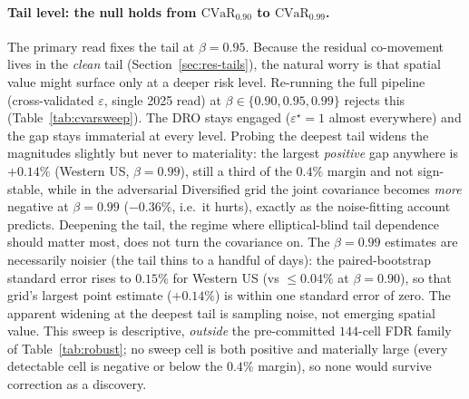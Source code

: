 \documentclass[10pt,twocolumn]{article}
\newcommand{\CVaR}{\mathrm{CVaR}}
\begin{document}
\paragraph{Tail level: the null holds from $\CVaR_{0.90}$ to $\CVaR_{0.99}$.}
The primary read fixes the tail at $\beta=0.95$. Because the residual co-movement
lives in the \emph{clean} tail (Section~\ref{sec:res-tails}), the natural worry is
that spatial value might surface only at a deeper risk level. Re-running the full
pipeline (cross-validated $\varepsilon$, single 2025 read) at
$\beta\in\{0.90,0.95,0.99\}$ rejects this (Table~\ref{tab:cvarsweep}). The DRO stays
engaged ($\varepsilon^\star=1$ almost everywhere) and the gap stays immaterial at
every level. Probing the deepest tail widens the magnitudes slightly but never to
materiality: the largest \emph{positive} gap anywhere is $+0.14\%$ (Western US,
$\beta=0.99$), still a third of the $0.4\%$ margin and not sign-stable, while in the
adversarial Diversified grid the joint covariance becomes \emph{more} negative at
$\beta=0.99$ ($-0.36\%$, i.e.\ it hurts), exactly as the noise-fitting account
predicts. Deepening the tail, the regime where elliptical-blind tail dependence
should matter most, does not turn the covariance on.
The $\beta=0.99$ estimates are necessarily noisier (the tail thins to a handful of
days): the paired-bootstrap standard error rises to $0.15\%$ for Western US (vs
$\le0.04\%$ at $\beta=0.90$), so that grid's largest point estimate ($+0.14\%$) is
within one standard error of zero. The apparent widening at the deepest tail is
sampling noise, not emerging spatial value. This sweep is descriptive, \emph{outside}
the pre-committed $144$-cell FDR family of Table~\ref{tab:robust}; no sweep cell is
both positive and materially large (every detectable cell is negative or below the
$0.4\%$ margin), so none would survive correction as a discovery.

\begin{table}[h]
\centering\small
\caption{Spatial gap range (min, max over the nine cells, \% of test
$\CVaR_\beta$) at three tail levels. The DRO is engaged ($\varepsilon^\star=1$
almost everywhere) throughout. No level yields a sign-stable positive gap reaching
the $0.4\%$ materiality margin.}
\label{tab:cvarsweep}
\end{table}
\end{document}
